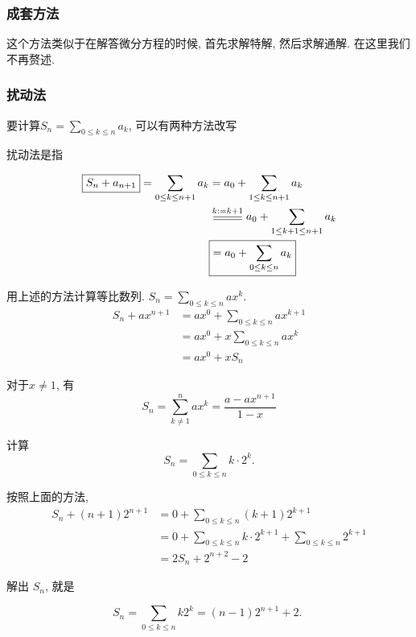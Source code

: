 \documentclass{ctexart}
\begin{document}
\subsubsection{成套方法} 这个方法类似于在解答微分方程的时候, 首先求解特解, 然后求解通解. 在这里我们不再赘述.

\subsubsection{扰动法} 要计算$S_n=\sum_{0 \leq k \leq n} a_k$, 可以有两种方法改写

\begin{proposition}
	扰动法是指

	\begin{align*}
		\boxed{S_{n}+a_{n+1}}=\sum_{0\leq k\leq n+1}a_{k} & =a_{0}+\sum_{1\leq k\leq n+1}a_{k}                        \\
		                                                  & \varsub{k:=k+1}{0.9cm}a_{0}+\sum_{1\leq k+1\leq n+1}a_{k} \\
		                                                  & \boxed{=a_{0}+\sum_{0\leq k\leq n}a_{k}}
	\end{align*}

\end{proposition}

\begin{example}
	用上述的方法计算等比数列. $S_n=\sum_{0 \leq k \leq n} a x^k$.
	$$
		\begin{aligned}
			S_n+a x^{n+1} & =a x^0+\sum_{0 \leq k \leq n} a x^{k+1} \\
			              & =a x^0+x \sum_{0 \leq k \leq n} a x^k   \\
			              & =a x^0+x S_n
		\end{aligned}
	$$

	对于$x\neq 1$, 有
	$$
		S_n=\sum_{k\neq 1}^n a x^k=\frac{a-a x^{n+1}}{1-x}
	$$
\end{example}

\begin{example}[等差数列乘等比数列]
	计算
	$$
		S_n=\sum_{0 \leq k \leq n} k \cdot 2^k.
	$$

	按照上面的方法,
	$$
		\begin{aligned}
			S_n+(n+1) 2^{n+1} & =0+\sum_{0 \leq k \leq n}(k+1) 2^{k+1}                                    \\
			                  & = 0+\sum_{0 \leq k \leq n} k \cdot 2^{k+1}+\sum_{0 \leq k \leq n} 2^{k+1} \\
			                  & =2 S_n+ 2^{n+2}-2
		\end{aligned}
	$$

	解出 $S_n$, 就是

	$$
		S_n=\sum_{0 \leq k \leq n} k 2^k=(n-1) 2^{n+1}+2 \text {. }
	$$
\end{example}
\end{document}
